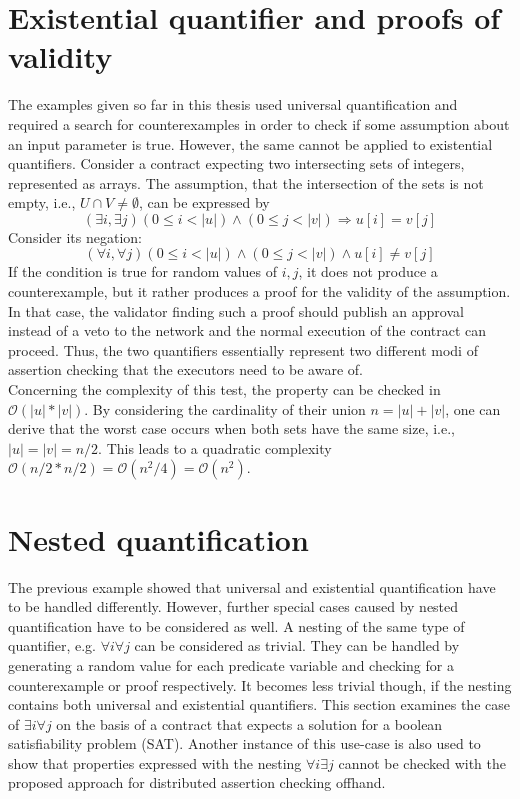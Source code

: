 \section{Existential quantifier and proofs of validity}\label{sec:existential}
The examples given so far in this thesis used universal quantification and required a search for counterexamples in order to check if some assumption about an input parameter is true. However, the same cannot be applied to existential quantifiers. Consider a contract expecting two intersecting sets of integers, represented as arrays. The assumption, that the intersection of the sets is not empty, i.e., $U \cap V \neq \emptyset$, can be expressed by
\begin{equation}\label{eq:intersect}
  (\exists i, \exists j) (0 \le i < |u|) \land (0 \le j < |v|) \Rightarrow u[i] = v[j]
\end{equation}
Consider its negation:
\begin{equation}\label{eq:intersect_neg}
  (\forall i, \forall j) (0 \le i < |u|) \land (0 \le j < |v|) \land u[i] \neq v[j]
\end{equation}
If the condition is true for random values of $i,j$, it does not produce a counterexample, but it rather produces a proof for the validity of the assumption. In that case, the validator finding such a proof should publish an approval instead of a veto to the network and the normal execution of the contract can proceed. Thus, the two quantifiers essentially represent two different modi of assertion checking that the executors need to be aware of. \\
Concerning the complexity of this test, the property can be checked in $\mathcal{O}(|u|*|v|)$. By considering the cardinality of their union $n = |u|+|v|$, one can derive that the worst case occurs when both sets have the same size, i.e., $|u| = |v| = n/2$. This leads to a quadratic complexity $\mathcal{O}(n/2 * n/2) = \mathcal{O}(n^2/4) = \mathcal{O}(n^2)$.

\section{Nested quantification}
The previous example showed that universal and existential quantification have to be handled differently. However, further special cases caused by nested quantification have to be considered as well. A nesting of the same type of quantifier, e.g. $\forall i \forall j$ can be considered as trivial. They can be handled by generating a random value for each predicate variable and checking for a counterexample or proof respectively. It becomes less trivial though, if the nesting contains both universal and existential quantifiers. This section examines the case of $\exists i \forall j$ on the basis of a contract that expects a solution for a boolean satisfiability problem (SAT). Another instance of this use-case is also used to show that properties expressed with the nesting $\forall i \exists j$ cannot be checked with the proposed approach for distributed assertion checking offhand.

